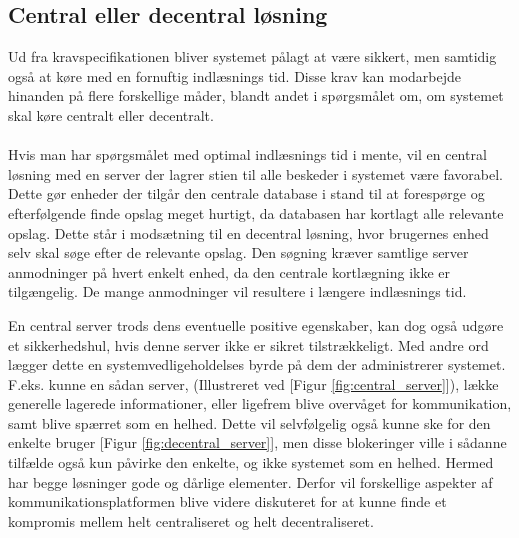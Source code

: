 \subsection{Central eller decentral løsning}
Ud fra kravspecifikationen bliver systemet pålagt at være sikkert, men samtidig også at køre med en fornuftig indlæsnings tid. Disse krav kan modarbejde hinanden på flere forskellige måder, blandt andet i spørgsmålet om, om systemet skal køre centralt eller decentralt.
\\\\
Hvis man har spørgsmålet med optimal indlæsnings tid i mente, vil en central løsning med en server der lagrer stien til alle beskeder i systemet være favorabel. Dette gør enheder der tilgår den centrale database i stand til at forespørge og efterfølgende finde opslag meget hurtigt, da databasen har kortlagt alle relevante opslag. Dette står i modsætning til en decentral løsning, hvor brugernes enhed selv skal søge efter de relevante opslag. Den søgning kræver samtlige server anmodninger på hvert enkelt enhed, da den centrale kortlægning ikke er tilgængelig. De mange anmodninger vil resultere i længere indlæsnings tid.


En central server trods dens eventuelle positive egenskaber, kan dog også udgøre et sikkerhedshul, hvis denne server ikke er sikret tilstrækkeligt. Med andre ord lægger dette en systemvedligeholdelses byrde på dem der administrerer systemet. F.eks. kunne en sådan server, (Illustreret ved [Figur \ref{fig:central_server}]), lække generelle lagerede informationer, eller ligefrem blive overvåget for kommunikation, samt blive spærret som en helhed. Dette vil selvfølgelig også kunne ske for den enkelte bruger [Figur \ref{fig:decentral_server}], men disse blokeringer ville i sådanne tilfælde også kun påvirke den enkelte, og ikke systemet som en helhed.
Hermed har begge løsninger gode og dårlige elementer. Derfor vil forskellige aspekter af kommunikationsplatformen blive videre diskuteret for at kunne finde et kompromis mellem helt centraliseret og helt decentraliseret.

